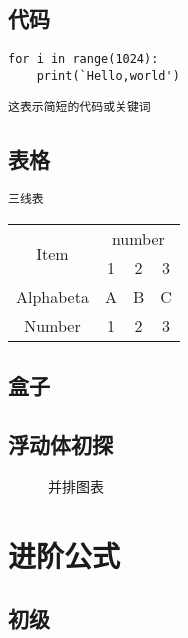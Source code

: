 \documentclass[,UTF8,titlepage]{ctexart}
\begin{document}
\subsection{代码}
\begin{verbatim}
for i in range(1024):
    print(`Hello,world')
\end{verbatim}
\verb|这表示简短的代码或关键词|
\subsection{表格}
\verb|三线表|
\begin{tabular}{cccc}
 \toprule
 \multirow{2}{*}{Item} & \multicolumn{3}{c}{number}\\%
 \cmidrule{2-4}
    & 1 & 2 & 3 \\
\midrule
Alphabeta & A & B & C \\ \cline{2-3}
Number & 1 & 2 & 3 \\[6pt]
\bottomrule
\end{tabular}
\subsection{盒子}
\setlength{\fboxrule}{1.6pt}
\setlength{\fboxsep}{1em}
\subsection{浮动体初探}
\begin{figure}[h]
    \centering
    \quad
    \caption{并排图表}
\end{figure}
\section{进阶公式}
\subsection{初级}
\end{document}
